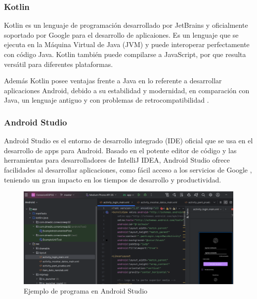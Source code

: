 \documentclass[../main]{subfiles}
\begin{document}
\subsubsection{Kotlin}

Kotlin es un lenguaje de programación desarrollado por JetBrains y oficialmente
soportado por Google para el desarrollo de aplicaiones. Es un lenguaje que se
ejecuta en la Máquina Virtual de Java (JVM) y puede interoperar perfectamente
con código Java. Kotlin también puede compilarse a JavaScript, por que resulta
versátil para diferentes plataformas\cite{JetBrains}.

Además Kotlin posee ventajas frente a Java en lo referente a desarrollar
aplicaciones Android, debido a su estabilidad y modernidad, en comparación con
Java, un lenguaje antiguo y con problemas de retrocompatibilidad
\cite{Moskala_Wojda_2017b}.

\subsubsection{Android Studio}

Android Studio es el entorno de desarrollo integrado (IDE) oficial que se usa en
el desarrollo de apps para Android. Basado en el potente editor de código y las
herramientas para desarrolladores de IntelliJ IDEA, Android Studio ofrece
facilidades al desarrollar aplicaciones, como fácil acceso a los servicios de
Google \cite{android_developers}, teniendo un gran impacto en los tiempos de
desarrollo y productividad.

\begin{figure}[H]
	\centering
	\includegraphics[width=15cm]{res/EjemploDeProgramaAndroidStudio.png}
	\caption{Ejemplo de programa en Android Studio}
	\label{ImagenEjemploAndroidStudio}
\end{figure}
\end{document}
